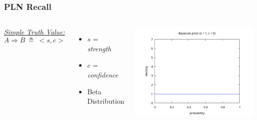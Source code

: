 \documentclass[aspectratio=169]{beamer}
\newcommand{\limp}{\Rightarrow}
\newcommand{\STV}[2]{<\!#1, #2\!>}
\begin{document}
\begin{frame}
  \frametitle{PLN Recall}
  \begin{columns}
    \column{5cm}
    \underline{\emph{Simple Truth Value:}}
    $$A \limp B\ \measeq\ \STV{s}{c}$$
    \begin{itemize}
    \item $s$ = \emph{strength}
    \item $c$ = \emph{confidence}
    \item Beta Distribution
    \end{itemize}
    \column{10cm}
    \includegraphics[scale=0.4]{figs/bayesian_prior.png}
  \end{columns}
\end{frame}
\end{document}
